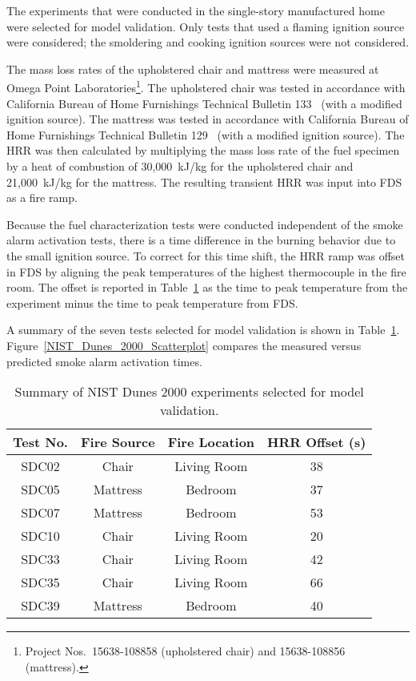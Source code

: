 The experiments that were conducted in the single-story manufactured home were selected for model validation.
Only tests that used a flaming ignition source were considered; the smoldering and cooking ignition sources
were not considered.

The mass loss rates of the upholstered chair and mattress were measured at Omega Point
Laboratories\footnote{Project Nos.~15638-108858 (upholstered chair) and 15638-108856 (mattress).}.
The upholstered chair was tested in accordance with California Bureau of Home Furnishings Technical
Bulletin 133~\cite{CALTB133} (with a modified ignition source). The mattress was tested in accordance
with California Bureau of Home Furnishings Technical Bulletin 129~\cite{CALTB129} (with a modified ignition source).
The HRR was then calculated by multiplying the mass loss rate of the fuel specimen by a heat of combustion of
30,000~kJ/kg for the upholstered chair and 21,000~kJ/kg for the mattress. The resulting transient HRR was
input into FDS as a fire ramp.

Because the fuel characterization tests were conducted independent of the
smoke alarm activation tests, there is a time difference in the burning behavior due to the small ignition
source. To correct for this time shift, the HRR ramp was offset in FDS by aligning the peak temperatures
of the highest thermocouple in the fire room. The offset is reported in Table~\ref{NIST_Dunes_2000_Summary}
as the time to peak temperature from the experiment minus the time to peak temperature from FDS.

A summary of the seven tests selected for model validation is shown in Table~\ref{NIST_Dunes_2000_Summary}.
Figure~\ref{NIST_Dunes_2000_Scatterplot} compares the measured versus predicted smoke alarm activation times.

\begin{table}[h!]
\caption{Summary of NIST Dunes 2000 experiments selected for model validation.}
\begin{center}
\begin{tabular}{|c|c|c|c|}
\hline
Test No.  &  Fire Source  &  Fire Location  &  HRR Offset (s)  \\ \hline \hline
SDC02     &  Chair        &  Living Room    &  38              \\ \hline
SDC05     &  Mattress     &  Bedroom        &  37              \\ \hline
SDC07     &  Mattress     &  Bedroom        &  53              \\ \hline
SDC10     &  Chair        &  Living Room    &  20              \\ \hline
SDC33     &  Chair        &  Living Room    &  42              \\ \hline
SDC35     &  Chair        &  Living Room    &  66              \\ \hline
SDC39     &  Mattress     &  Bedroom        &  40              \\ \hline
\end{tabular}
\end{center}
\label{NIST_Dunes_2000_Summary}
\end{table}

